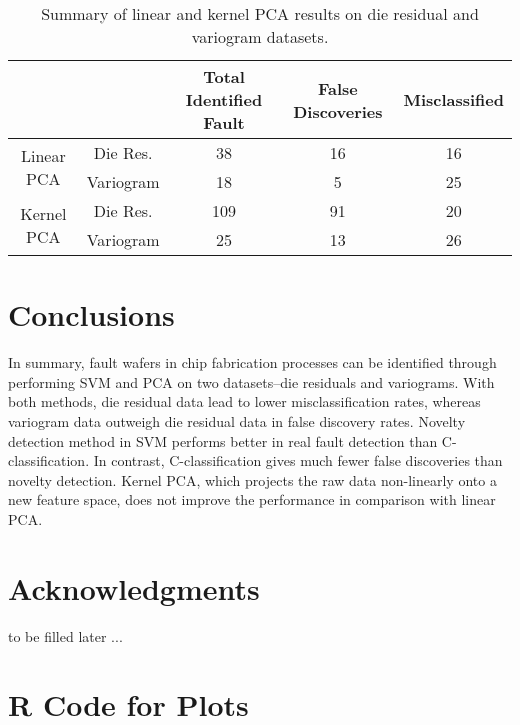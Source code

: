 \documentclass[12pt]{article}
\numberwithin{equation}{section}
\numberwithin{table}{section}
\numberwithin{figure}{section}
\begin{document}
\begin{table}[!tph]
\caption{Summary of linear and kernel PCA results on die residual and variogram
datasets. \label{tab:Summary-of-linear}}
\begin{centering}
\begin{tabular}{|c|c|c|c|c|}
\hline 
 &  & Total Identified Fault & False Discoveries & Misclassified\tabularnewline
\hline 
\multirow{2}{*}{Linear PCA} & Die Res. & 38 & 16 & 16\tabularnewline
\cline{2-5} 
 & Variogram & 18 & 5 & 25\tabularnewline
\hline 
\multirow{2}{*}{Kernel PCA} & Die Res. & 109 & 91 & 20\tabularnewline
\cline{2-5} 
 & Variogram & 25 & 13 & 26\tabularnewline
\hline 
\end{tabular}
\par\end{centering}

\end{table}






\section{Conclusions} \label{summary}
\hspace{12 pt}
In summary, fault wafers in chip fabrication processes can be identified
through performing SVM and PCA on two datasets--die residuals and
variograms. With both methods, die residual data lead to lower misclassification
rates, whereas variogram data outweigh die residual data in false
discovery rates. Novelty detection method in SVM performs better in
real fault detection than C-classification. In contrast, C-classification
gives much fewer false discoveries than novelty detection. Kernel
PCA, which projects the raw data non-linearly onto a new feature space,
does not improve the performance in comparison with linear PCA.


\section*{Acknowledgments}

to be filled later ... 


\appendix
\section{R Code for Plots} \label{appcode}





\end{document}
